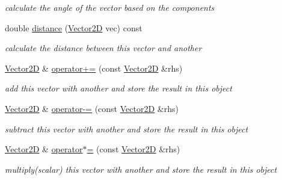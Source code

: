 \begin{DoxyCompactItemize}
\begin{DoxyCompactList}\small\item\em calculate the angle of the vector based on the components \end{DoxyCompactList}\item 
double \hyperlink{structrigid2d_1_1Vector2D_a929393171d0ac3cc0a3f438d9a2c9cf1}{distance} (\hyperlink{structrigid2d_1_1Vector2D}{Vector2D} vec) const
\begin{DoxyCompactList}\small\item\em calculate the distance between this vector and another \end{DoxyCompactList}\item 
\hyperlink{structrigid2d_1_1Vector2D}{Vector2D} \& \hyperlink{structrigid2d_1_1Vector2D_aa17e3466179575f598b77153cbfea9e6}{operator+=} (const \hyperlink{structrigid2d_1_1Vector2D}{Vector2D} \&rhs)
\begin{DoxyCompactList}\small\item\em add this vector with another and store the result in this object \end{DoxyCompactList}\item 
\hyperlink{structrigid2d_1_1Vector2D}{Vector2D} \& \hyperlink{structrigid2d_1_1Vector2D_a8ef35cca4a51ecd76bee8b8dca5e3a63}{operator-\/=} (const \hyperlink{structrigid2d_1_1Vector2D}{Vector2D} \&rhs)
\begin{DoxyCompactList}\small\item\em subtract this vector with another and store the result in this object \end{DoxyCompactList}\item 
\hyperlink{structrigid2d_1_1Vector2D}{Vector2D} \& \hyperlink{structrigid2d_1_1Vector2D_a0da46fe8a92fcb6ecea09425c6ead294}{operator$\ast$=} (const \hyperlink{structrigid2d_1_1Vector2D}{Vector2D} \&rhs)
\begin{DoxyCompactList}\small\item\em multiply(scalar) this vector with another and store the result in this object \end{DoxyCompactList}\end{DoxyCompactItemize}
